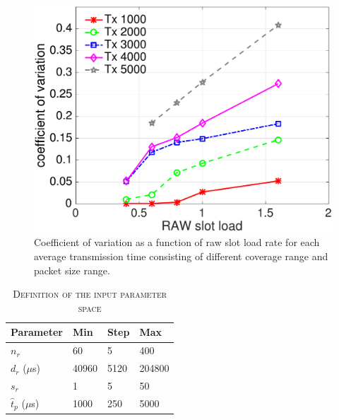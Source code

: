 \begin{figure}[t]
  \centering
   \includegraphics[width=0.75\columnwidth]{figures/result_new_load_cov_fliter.pdf}
    \caption{Coefficient of variation as a function of \gls{raw} slot load rate for each average transmission time consisting of different coverage range and packet size range.
    \label{fig:tx-diff-load}}
\end{figure}







\begin{table}[t]
\centering
\renewcommand{\arraystretch}{1.2}
\caption{\textsc{Definition of the input parameter space}\label{tab:sumo parameters}}
\begin{tabular}{llll}
\hline
\textbf{Parameter}       & \textbf{Min}  & \textbf{Step}   & \textbf{Max}  \\
\hline
$n_r$        & 60 & 5 & 400  \\
$d_r$ ($\mu$s)          & 40960 & 5120 & 204800    \\
$s_r$           & 1 & 5 & 50    \\
$\hat{t}_p$ ($\mu$s)           & 1000 & 250 & 5000    \\
\hline
\end{tabular}
\end{table}


